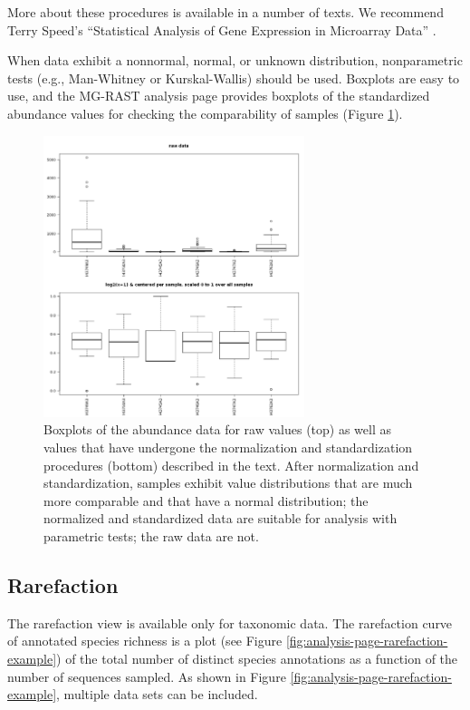 \documentclass[12pt,fullpage]{report}
\begin{document}
More about these procedures is available in a number of texts. We recommend Terry Speed's ``Statistical Analysis of Gene Expression in Microarray Data'' \cite{1584883278}.

When data exhibit a nonnormal, normal, or unknown distribution, nonparametric tests (e.g., Man-Whitney or Kurskal-Wallis) should be used. Boxplots are easy to use, and the MG-RAST analysis page provides boxplots of the standardized abundance values for checking the comparability of samples (Figure \ref{fig:boxplots}).

\begin{figure}
\begin{center}
\includegraphics[width=3in]{Images/boxplots.png}
\end{center}
\caption{
Boxplots of the abundance data for raw values (top) as well as values that have undergone the normalization and standardization procedures (bottom) described in the text. After normalization and standardization, samples exhibit value distributions that are much more comparable and that have a normal distribution; the normalized and standardized data are suitable for analysis with parametric tests; the raw data are not.
}
\label{fig:boxplots}
\end{figure}



\subsection*{Rarefaction}
\label{section:analysis-page-rarefaction}

The rarefaction view is available only for taxonomic data. The
rarefaction curve of annotated species richness is a plot (see Figure
\ref{fig:analysis-page-rarefaction-example}) of the total number
of distinct species annotations as a function of the number of
sequences sampled. As shown in Figure \ref{fig:analysis-page-rarefaction-example},
multiple data sets can be included.
\end{document}
